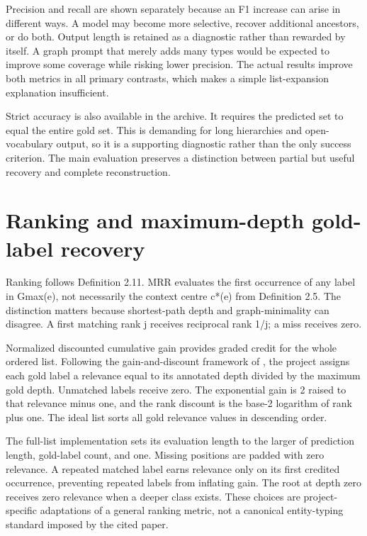Precision and recall are shown separately because an F1 increase can arise in different ways. A model may become more selective, recover additional ancestors, or do both. Output length is retained as a diagnostic rather than rewarded by itself. A graph prompt that merely adds many types would be expected to improve some coverage while risking lower precision. The actual results improve both metrics in all primary contrasts, which makes a simple list-expansion explanation insufficient.


Strict accuracy is also available in the archive. It requires the predicted set to equal the entire gold set. This is demanding for long hierarchies and open-vocabulary output, so it is a supporting diagnostic rather than the only success criterion. The main evaluation preserves a distinction between partial but useful recovery and complete reconstruction.


\FloatBarrier

\section{Ranking and maximum-depth gold-label recovery}

Ranking follows Definition 2.11. MRR evaluates the first occurrence of any label in Gmax(e), not necessarily the context centre c*(e) from Definition 2.5. The distinction matters because shortest-path depth and graph-minimality can disagree. A first matching rank j receives reciprocal rank 1/j; a miss receives zero.


Normalized discounted cumulative gain provides graded credit for the whole ordered list. Following the gain-and-discount framework of \citet{jarvelin2002}, the project assigns each gold label a relevance equal to its annotated depth divided by the maximum gold depth. Unmatched labels receive zero. The exponential gain is 2 raised to that relevance minus one, and the rank discount is the base-2 logarithm of rank plus one. The ideal list sorts all gold relevance values in descending order.


The full-list implementation sets its evaluation length to the larger of prediction length, gold-label count, and one. Missing positions are padded with zero relevance. A repeated matched label earns relevance only on its first credited occurrence, preventing repeated labels from inflating gain. The root at depth zero receives zero relevance when a deeper class exists. These choices are project-specific adaptations of a general ranking metric, not a canonical entity-typing standard imposed by the cited paper.


